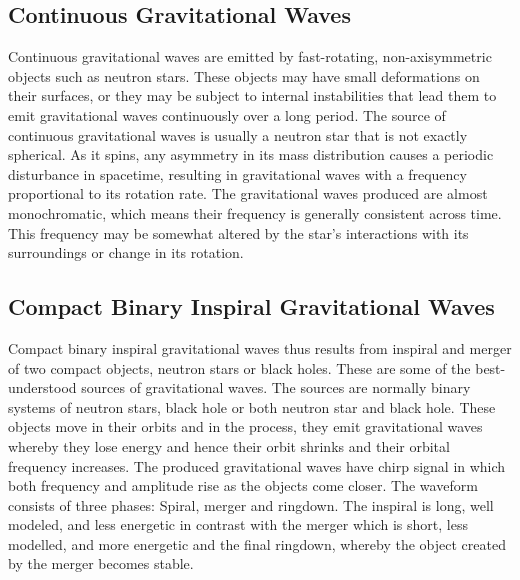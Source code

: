 \subsection{Continuous Gravitational Waves} 
Continuous gravitational waves are emitted by fast-rotating, non-axisymmetric objects such as neutron stars. These objects may have small deformations on their surfaces, or they may be subject to internal instabilities that lead them to emit gravitational waves continuously over a long period. The source of continuous gravitational waves is usually a neutron star that is not exactly spherical. As it spins, any asymmetry in its mass distribution causes a periodic disturbance in spacetime, resulting in gravitational waves with a frequency proportional to its rotation rate. The gravitational waves produced are almost monochromatic, which means their frequency is generally consistent across time. This frequency may be somewhat altered by the star's interactions with its surroundings or change in its rotation.
\vspace{0.2cm}

\subsection{Compact Binary Inspiral Gravitational Waves} 

Compact binary inspiral gravitational waves thus results from inspiral and merger of two compact objects, neutron stars or black holes. These are some of the best-understood sources of gravitational waves. The sources are normally binary systems of neutron stars, black hole or both neutron star and black hole. These objects move in their orbits and in the process, they emit gravitational waves whereby they lose energy and hence their orbit shrinks and their orbital frequency increases. The produced gravitational waves have chirp signal in which both frequency and amplitude rise as the objects come closer. The waveform consists of three phases: Spiral, merger and ringdown. The inspiral is long, well modeled, and less energetic in contrast with the merger which is short, less modelled, and more energetic and the final ringdown, whereby the object created by the merger becomes stable.
\vspace{0.2cm}

